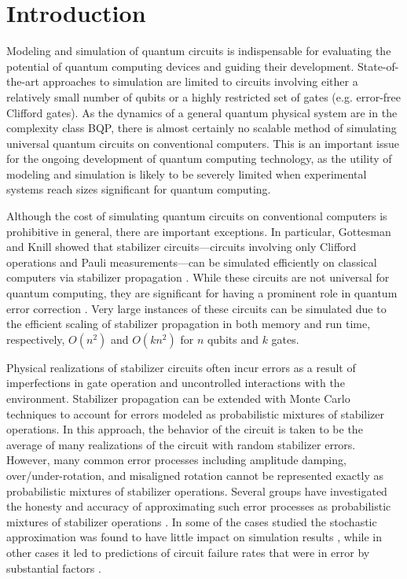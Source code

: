 \documentclass[twocolumn,pra]{revtex4}
\begin{document}
\section{Introduction}
Modeling and simulation of quantum circuits is indispensable for evaluating the potential of quantum computing devices and guiding their development. State-of-the-art approaches to simulation are limited to circuits involving either a relatively small number of qubits or a highly restricted set of gates (e.g. error-free Clifford gates). As the dynamics of a general quantum physical system are in the complexity class BQP, there is almost certainly no scalable method of simulating universal quantum circuits on conventional computers. This is an important issue for the ongoing development of quantum computing technology, as the utility of modeling and simulation is likely to be severely limited when experimental systems reach sizes significant for quantum computing.
\par
Although the cost of simulating quantum circuits on conventional computers is prohibitive in general, there are important exceptions. In particular, Gottesman and Knill showed that stabilizer circuits---circuits involving only Clifford operations and Pauli measurements---can be simulated efficiently on classical computers via stabilizer propagation \cite{gottesman1998heisenberg}. While these circuits are not universal for quantum computing, they are significant for having a prominent role in quantum error correction \cite{Gaitan2008}. Very large instances of these circuits can be simulated due to the efficient scaling of stabilizer propagation in both memory and run time, respectively, $O(n^2)$ and $O(k n^2)$ for $n$ qubits and $k$ gates.
\par
Physical realizations of stabilizer circuits often incur errors as a result of imperfections in gate operation and uncontrolled interactions with the environment. Stabilizer propagation can be extended with Monte Carlo techniques to account for errors modeled as probabilistic mixtures of stabilizer operations. In this approach, the behavior of the circuit is taken to be the average of many realizations of the circuit with random stabilizer errors. However, many common error processes including amplitude damping, over/under-rotation, and misaligned rotation cannot be represented exactly as probabilistic mixtures of stabilizer operations.  Several groups have investigated the honesty and accuracy of approximating such error processes as probabilistic mixtures of stabilizer operations \cite{Magesan2013, Gutierrez2015}. In some of the cases studied the stochastic approximation was found to have little impact on simulation results \cite{Puzzuoli2014, Gutierrez2015}, while in other cases it led to predictions of circuit failure rates that were in error by substantial factors \cite{Gutierrez2016}.
\end{document}
